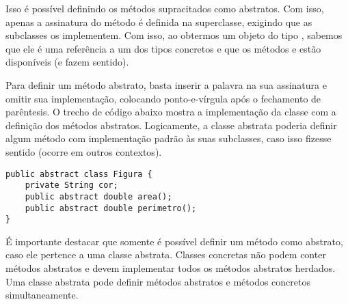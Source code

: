 Isso é possível definindo os métodos supracitados como abstratos. Com isso, apenas a assinatura do método é definida na superclasse, exigindo que as subclasses os implementem. Com isso, ao obtermos um objeto do tipo , sabemos que ele é uma referência a um dos tipos concretos e que os métodos  e  estão disponíveis (e fazem sentido).

Para definir um método abstrato, basta inserir a palavra  na sua assinatura e omitir sua implementação, colocando ponto-e-vírgula após o fechamento de parêntesis. O trecho de código abaixo mostra a implementação da classe  com a definição dos métodos abstratos. Logicamente, a classe abstrata poderia definir algum método com implementação padrão às suas subclasses, caso isso fizesse sentido (ocorre em outros contextos).

\begin{verbatim}
public abstract class Figura {
	private String cor;
	public abstract double area();
	public abstract double perimetro();
}
\end{verbatim}

É importante destacar que somente é possível definir um método como abstrato, caso ele pertence a uma classe abstrata. Classes concretas não podem conter métodos abstratos e devem implementar todos os métodos abstratos herdados. Uma classe abstrata pode definir métodos abstratos e métodos concretos simultaneamente.